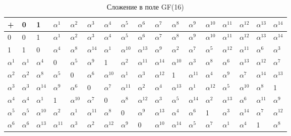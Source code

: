 \begin{table}[h!]
\caption{Сложение в поле GF(16)}\scriptsize
  \begin{tabular}{|l|l|l|l|l|l|l|l|l|l|l|l|l|l|l|l|l|}
  \hline
  + & 0 & 1 & $\alpha^1$ & $\alpha^2$ & $\alpha^3$ & $\alpha^4$ & $\alpha^5$ & $\alpha^6$ & $\alpha^7$ & $\alpha^8$ & $\alpha^9$ & $\alpha^{10}$ & $\alpha^{11}$ & $\alpha^{12}$ & $\alpha^{13}$ & $\alpha^{14}$ \\
  \hline
  0 & 0 & 1 & $\alpha^1$ & $\alpha^2$ & $\alpha^3$ & $\alpha^4$ & $\alpha^5$ & $\alpha^6$ & $\alpha^7$ & $\alpha^8$ & $\alpha^9$ & $\alpha^{10}$ & $\alpha^{11}$ & $\alpha^{12}$ & $\alpha^{13}$ & $\alpha^{14}$ \\
  \hline
  1 & 1 & 0 & $\alpha^4$ & $\alpha^8$ & $\alpha^{14}$ & $\alpha^1$ & $\alpha^{10}$ & $\alpha^{13}$ & $\alpha^9$ & $\alpha^2$ & $\alpha^7$ & $\alpha^5$ & $\alpha^{12}$ & $\alpha^{11}$ & $\alpha^6$ & $\alpha^3$ \\
  \hline
  $\alpha^1$& $\alpha^1$& $\alpha^4$ & 0 & $\alpha^5$ & $\alpha^9$ & 1 & $\alpha^2$ & $\alpha^{11}$ & $\alpha^{14}$ & $\alpha^{10}$ & $\alpha^3$ & $\alpha^8$ & $\alpha^6$ & $\alpha^{13}$ & $\alpha^{12}$ & $\alpha^7$ \\
  \hline
  $\alpha^2$ & $\alpha^2$ & $\alpha^8$ & $\alpha^5$ & 0 & $\alpha^6$ & $\alpha^{10}$ & $\alpha^1$& $\alpha^3$ & $\alpha^{12}$ & 1 & $\alpha^{11}$ & $\alpha^4$ & $\alpha^9$ & $\alpha^7$ & $\alpha^{14}$ & $\alpha^{13}$ \\
  \hline
  $\alpha^3$ & $\alpha^3$ & $\alpha^{14}$ & $\alpha^9$ & $\alpha^6$ & 0 & $\alpha^7$ & $\alpha^{11}$ & $\alpha^2$ & $\alpha^4$ & $\alpha^{13}$ & $\alpha^1$& $\alpha^{12}$ & $\alpha^5$ & $\alpha^{10}$ & $\alpha^8$ & 1 \\
  \hline
  $\alpha^4$ & $\alpha^4$ & $\alpha^1$& 1 & $\alpha^{10}$ & $\alpha^7$ & 0 & $\alpha^8$ & $\alpha^{12}$ & $\alpha^3$ & $\alpha^5$ & $\alpha^{14}$ & $\alpha^2$ & $\alpha^{13}$ & $\alpha^6$ & $\alpha^{11}$ & $\alpha^9$ \\
  \hline
  $\alpha^5$ & $\alpha^5$ & $\alpha^{10}$ & $\alpha^2$ & $\alpha^1$& $\alpha^{11}$ & $\alpha^8$ & 0 & $\alpha^9$ & $\alpha^{13}$ & $\alpha^4$ & $\alpha^6$ & 1 & $\alpha^3$ & $\alpha^{14}$ & $\alpha^7$ & $\alpha^{12}$ \\
  \hline
  $\alpha^6$ & $\alpha^6$ & $\alpha^{13}$ & $\alpha^{11}$ & $\alpha^3$ & $\alpha^2$ & $\alpha^{12}$ & $\alpha^9$ & 0 & $\alpha^{10}$ & $\alpha^{14}$ & $\alpha^5$ & $\alpha^7$ & $\alpha^1$& $\alpha^4$ & 1 & $\alpha^8$ \\
  \hline

\end{tabular}
\end{table}
